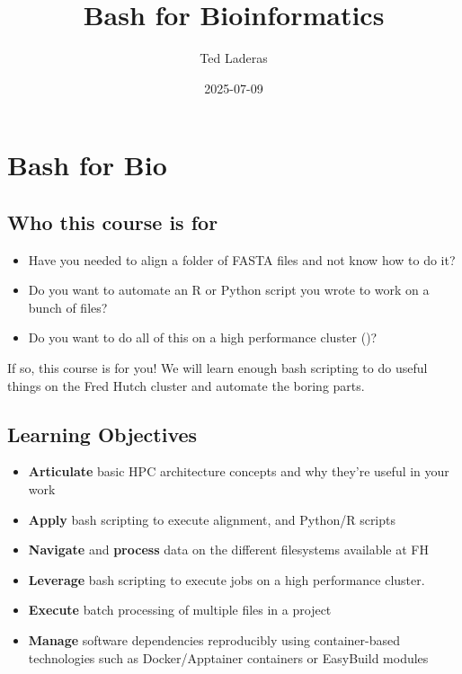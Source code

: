 \documentclass[
  letterpaper,
  DIV=11,
  numbers=noendperiod]{scrreprt}
\title{Bash for Bioinformatics}
\author{Ted Laderas}
\date{2025-07-09}
\providecommand{\tightlist}{%
  \setlength{\itemsep}{0pt}\setlength{\parskip}{0pt}}
\renewcommand*\contentsname{Table of contents}
\newcommand\contentsname{Table of contents}
\begin{document}
\maketitle

\renewcommand*\contentsname{Table of contents}
{
\hypersetup{linkcolor=}
\setcounter{tocdepth}{2}
\tableofcontents
}


\chapter*{Bash for Bio}\label{bash-for-bio}


\section*{Who this course is for}\label{who-this-course-is-for}


\begin{itemize}
\tightlist
\item
  Have you needed to align a folder of FASTA files and not know how to
  do it?
\item
  Do you want to automate an R or Python script you wrote to work on a
  bunch of files?
\item
  Do you want to do all of this on a high performance cluster ()?
\end{itemize}

If so, this course is for you! We will learn enough bash scripting to do
useful things on the Fred Hutch cluster and automate the boring parts.

\section*{Learning Objectives}\label{learning-objectives}


\begin{itemize}
\tightlist
\item
  \textbf{Articulate} basic HPC architecture concepts and why they're
  useful in your work
\item
  \textbf{Apply} bash scripting to execute alignment, and Python/R
  scripts
\item
  \textbf{Navigate} and \textbf{process} data on the different
  filesystems available at FH
\item
  \textbf{Leverage} bash scripting to execute jobs on a high performance
  cluster.
\item
  \textbf{Execute} batch processing of multiple files in a project
\item
  \textbf{Manage} software dependencies reproducibly using
  container-based technologies such as Docker/Apptainer containers or
  EasyBuild modules
\end{itemize}
\end{document}
